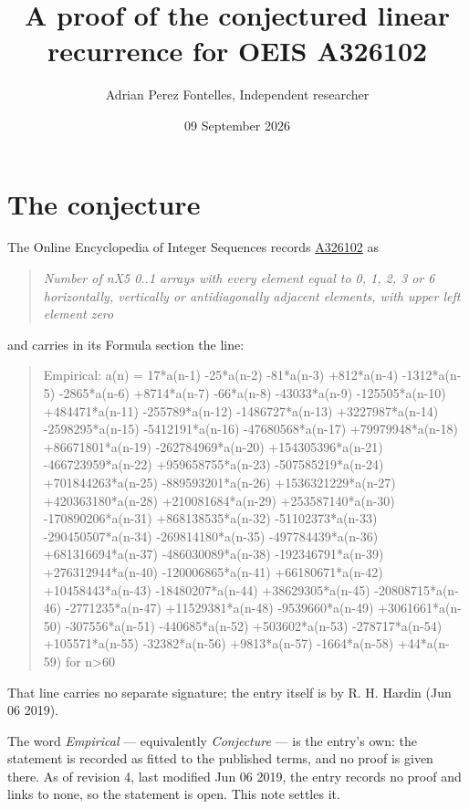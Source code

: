 \documentclass[11pt]{article}
\title{A proof of the conjectured linear recurrence for OEIS A326102}
\author{Adrian Perez Fontelles, Independent researcher}
\date{09 September 2026}
\theoremstyle{definition}
\begin{document}
\maketitle
\section{The conjecture}

The Online Encyclopedia of Integer Sequences records \href{https://oeis.org/A326102}{A326102} as

\begin{quote}\itshape Number of nX5 0..1 arrays with every element equal to 0, 1, 2, 3 or 6 horizontally, vertically or antidiagonally adjacent elements, with upper left element zero\end{quote}

and carries in its Formula section the line:

\begin{quote}\ttfamily Empirical: a(n) = 17*a(n-1) -25*a(n-2) -81*a(n-3) +812*a(n-4) -1312*a(n-5) -2865*a(n-6) +8714*a(n-7) -66*a(n-8) -43033*a(n-9) -125505*a(n-10) +484471*a(n-11) -255789*a(n-12) -1486727*a(n-13) +3227987*a(n-14) -2598295*a(n-15) -5412191*a(n-16) -47680568*a(n-17) +79979948*a(n-18) +86671801*a(n-19) -262784969*a(n-20) +154305396*a(n-21) -466723959*a(n-22) +959658755*a(n-23) -507585219*a(n-24) +701844263*a(n-25) -889593201*a(n-26) +1536321229*a(n-27) +420363180*a(n-28) +210081684*a(n-29) +253587140*a(n-30) -170890206*a(n-31) +868138535*a(n-32) -51102373*a(n-33) -290450507*a(n-34) -269814180*a(n-35) -497784439*a(n-36) +681316694*a(n-37) -486030089*a(n-38) -192346791*a(n-39) +276312944*a(n-40) -120006865*a(n-41) +66180671*a(n-42) +10458443*a(n-43) -18480207*a(n-44) +38629305*a(n-45) -20808715*a(n-46) -2771235*a(n-47) +11529381*a(n-48) -9539660*a(n-49) +3061661*a(n-50) -307556*a(n-51) -440685*a(n-52) +503602*a(n-53) -278717*a(n-54) +105571*a(n-55) -32382*a(n-56) +9813*a(n-57) -1664*a(n-58) +44*a(n-59) for n>60\end{quote}

That line carries no separate signature; the entry itself is by R. H. Hardin (Jun 06 2019).

The word {\itshape Empirical} --- equivalently {\itshape Conjecture} --- is the entry's own: the statement is recorded as fitted to the published terms, and no proof is given there. As of revision 4, last modified Jun 06 2019, the entry records no proof and links to none, so the statement is open. This note settles it.
\end{document}
